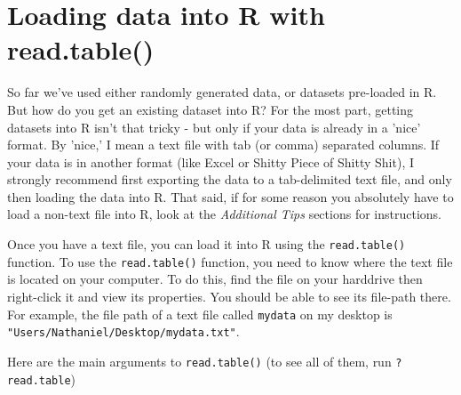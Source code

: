\documentclass{tufte-book}\usepackage[]{graphicx}\usepackage[]{color}
\begin{document}
\section{Loading data into R with read.table()}

So far we've used either randomly generated data, or datasets pre-loaded in R. But how do you get an existing dataset into R? For the most part, getting datasets into R isn't that tricky - but only if your data is already in a 'nice' format. By 'nice,' I mean a text file with tab (or comma) separated columns. If your data is in another format (like Excel or Shitty Piece of Shitty Shit), I strongly recommend first exporting the data to a tab-delimited text file, and only then loading the data into R. That said, if for some reason you absolutely have to load a non-text file into R, look at the \textit{Additional Tips} sections for instructions.

Once you have a text file, you can load it into R using the \texttt{read.table()} function. To use the \texttt{read.table()} function, you need to know where the text file is located on your computer. To do this, find the file on your harddrive then right-click it and view its properties. You should be able to see its file-path there. For example, the file path of a text file called \texttt{mydata} on my desktop is \texttt{"Users/Nathaniel/Desktop/mydata.txt"}.

Here are the main arguments to \texttt{read.table()} (to see all of them, run \texttt{?read.table})
\end{document}
